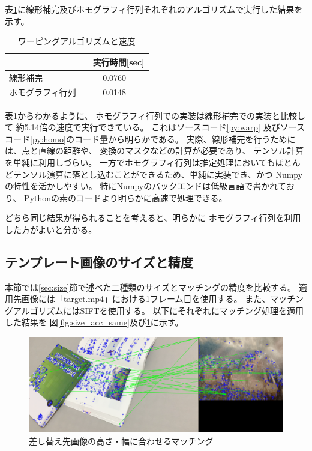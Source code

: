 表\ref{tb:warp}に線形補完及びホモグラフィ行列それぞれのアルゴリズムで実行した結果を示す。
\begin{table}[h]
    \centering
    \caption{ワーピングアルゴリズムと速度}
    \label{tb:warp}
    \begin{tabular}{lc} \hline \hline
         &　実行時間[sec]\\ \hline
        線形補完 & 0.0760 \\
        ホモグラフィ行列 & 0.0148 \\ \hline
    \end{tabular}
\end{table}
表\ref{tb:warp}からわかるように、
ホモグラフィ行列での実装は線形補完での実装と比較して
約5.14倍の速度で実行できている。
これはソースコード\ref{py:warp}
及びソースコード\ref{py:homo}のコード量から明らかである。
実際、線形補完を行うためには、点と直線の距離や、
変換のマスクなどの計算が必要であり、
テンソル計算を単純に利用しづらい。
一方でホモグラフィ行列は推定処理においてもほとんどテンソル演算に落とし込むことができるため、単純に実装でき、かつ
Numpyの特性を活かしやすい。
特にNumpyのバックエンドは低級言語で書かれており、
Pythonの素のコードより明らかに高速で処理できる。

どちら同じ結果が得られることを考えると、明らかに
ホモグラフィ行列を利用した方がよいと分かる。

\subsection{テンプレート画像のサイズと精度}\label{sec:size_acc}
本節では\ref{sec:size}節で述べた二種類のサイズとマッチングの精度を比較する。
適用先画像には「target.mp4」における1フレーム目を使用する。
また、マッチングアルゴリズムにはSIFTを使用する。
以下にそれぞれにマッチング処理を適用した結果を
図\ref{fig:size_acc_same}及び\ref{fig:size_acc_diff}に示す。

\begin{figure}[h]
    \centering
    \includegraphics[width=1\linewidth]{fig/matches_SIFT_difference.png}
    \caption{差し替え先画像の高さ・幅に合わせるマッチング}
    \label{fig:size_acc_diff}
\end{figure}


